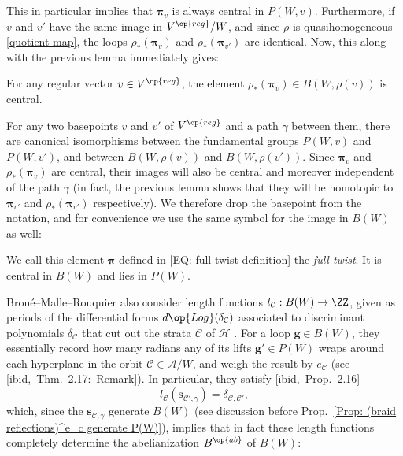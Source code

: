 This in particular implies that $\bm\pi_v$ is always central in $P(W,v)$. Furthermore, if $v$ and $v'$ have the same image in $V^{\op{reg}}/W$, and since $\rho$ is quasihomogeneous \eqref{quotient map}, the loops $\rho_*(\bm\pi_v)$ and $\rho_*(\bm\pi_{v'})$ are identical. Now, this along with the previous lemma immediately gives:

\begin{coro}\label{Corol. full twist is central in B(W)}
For any regular vector $v\in V^{\op{reg}}$, the element $\rho_*(\bm\pi_v)\in B(W,\rho(v))$ is central.
\end{coro}

For any two basepoints $v$ and $v'$ of $V^{\op{reg}}$ and a path $\gamma$ between them, there are canonical isomorphisms between the fundamental groups $P(W,v)$ and $P(W,v')$, and between $B(W,\rho(v))$ and $B(W,\rho(v'))$. Since $\bm\pi_v$ and $\rho_*(\bm \pi_v)$ are central, their images will also be central and moreover independent of the path $\gamma$ (in fact, the previous lemma shows that they will be homotopic to $\bm\pi_{v'}$ and $\rho_*(\bm\pi_{v'})$ respectively). We therefore drop the basepoint from the notation, and for convenience we use the same symbol for the image in $B(W)$ as well:
\begin{defi}\label{Defn: The full twist}
We call this element $\bm\pi$ defined in \eqref{EQ: full twist definition} the {\it\color{blue} full twist}. It is central in $B(W)$ and lies in $P(W)$.
\end{defi}


Brou{\'e}--Malle--Rouquier also consider \cite[Defn.~2.15]{broue-malle-rouquier-braid-hecke} length functions $l_{\mathcal{C}}:B(W)\rightarrow \ZZ$, given as periods of the differential forms $d\op{Log}(\delta_{\mathcal{C}})$ associated to discriminant polynomials $\delta_{\mathcal{C}}$ that cut out the strata $\mathcal{C}$ of $\mathcal{H}$ \cite[Defn.~2.15]{broue-malle-rouquier-braid-hecke}. For a loop $\bm g\in B(W)$, they essentially record how many radians any of its lifts $\bm g'\in P(W)$ wraps around each hyperplane in the orbit $\mathcal{C}\in\mathcal{A}/W$, and weigh the result by $e_{\mathcal{C}}$ (see [ibid,~Thm.~2.17:~Remark]). In particular, they satisfy [ibid,~Prop.~2.16] $$l_{\mathcal{C}}(\bm s_{\mathcal{C'},\gamma})=\delta_{\mathcal{C},\mathcal{C'}},$$ which, since the $\bm s_{\mathcal{C},\gamma}$ generate $B(W)$ (see discussion before Prop.~\ref{Prop: (braid reflections)^e_c generate P(W)}), implies that in fact these length functions completely determine the abelianization $B^{\op{ab}}$ of $B(W)$:

